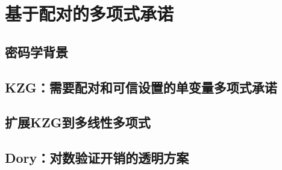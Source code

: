 \chapter{基于配对的多项式承诺}\label{chp:15PCPairing}
\section{密码学背景}\label{15.1}
\section{KZG：需要配对和可信设置的单变量多项式承诺}\label{15.2}
\section{扩展KZG到多线性多项式}\label{15.3}
\section{Dory：对数验证开销的透明方案}\label{15.4}
